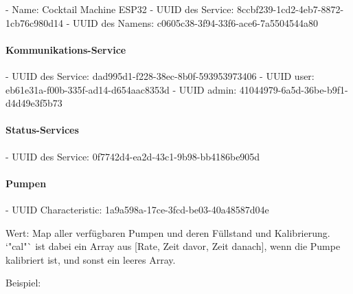 - Name: Cocktail Machine ESP32
- UUID des Service: 8ccbf239-1cd2-4eb7-8872-1cb76c980d14
- UUID des Namens: c0605c38-3f94-33f6-ace6-7a5504544a80

\paragraph{ Kommunikations-Service}

- UUID des Service: dad995d1-f228-38ec-8b0f-593953973406
- UUID user: eb61e31a-f00b-335f-ad14-d654aac8353d
- UUID admin: 41044979-6a5d-36be-b9f1-d4d49e3f5b73

\paragraph{ Status-Services}

- UUID des Service: 0f7742d4-ea2d-43c1-9b98-bb4186be905d

\paragraph{ Pumpen}

- UUID Characteristic: 1a9a598a-17ce-3fcd-be03-40a48587d04e

Wert: Map aller verfügbaren Pumpen und deren Füllstand und Kalibrierung. `"cal"` ist dabei ein Array aus [Rate, Zeit davor, Zeit danach], wenn die Pumpe kalibriert ist, und sonst ein leeres Array.

Beispiel:

